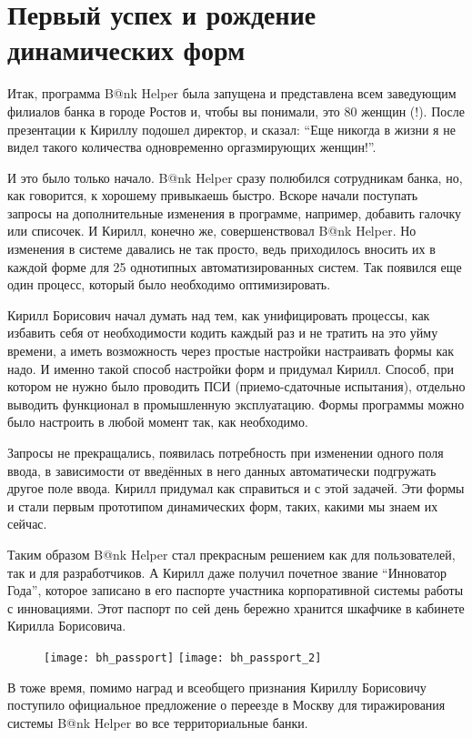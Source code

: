 \documentclass[../index.tex]{subfiles}
\begin{document}
\section{Первый успех и рождение динамических форм}

Итак, программа B@nk Helper была запущена и представлена всем заведующим филиалов банка в городе Ростов и, чтобы вы понимали, это 80 женщин (!). 
После презентации к Кириллу подошел директор, и сказал:
“Еще никогда в жизни я не видел такого количества одновременно оргазмирующих женщин!”.


И это было только начало. B@nk Helper сразу полюбился сотрудникам банка, но, как говорится, к хорошему привыкаешь быстро. Вскоре начали поступать запросы на дополнительные изменения в программе, например, добавить галочку или списочек. И Кирилл, конечно же,  совершенствовал B@nk Helper. Но изменения в системе давались не так просто, ведь приходилось вносить их в каждой форме для 25 однотипных автоматизированных систем. Так появился еще один процесс, который было необходимо оптимизировать. 


Кирилл Борисович начал думать над тем, как унифицировать процессы, как избавить себя от необходимости кодить каждый раз и не тратить на это уйму времени, а иметь возможность через простые настройки настраивать формы как надо. И именно такой способ настройки форм и придумал Кирилл. Способ, при котором не нужно было проводить ПСИ (приемо-сдаточные испытания), отдельно выводить функционал в промышленную эксплуатацию.  Формы программы можно было настроить в любой момент так, как необходимо. 


Запросы не прекращались, появилась потребность при изменении одного поля ввода, в зависимости от введённых в него данных автоматически подгружать другое поле ввода. Кирилл придумал как справиться и с этой задачей. Эти формы и стали первым прототипом динамических форм, таких, какими мы знаем их сейчас. 


Таким образом B@nk Helper стал прекрасным решением как для пользователей, так и для разработчиков. А Кирилл даже получил почетное звание “Инноватор Года”, которое записано в его паспорте участника  корпоративной системы работы с инновациями. Этот паспорт по сей день  бережно хранится шкафчике в кабинете Кирилла Борисовича. 

\begin{figure}[h]
	\texttt{[image: bh\_passport]}
	\texttt{[image: bh\_passport\_2]}
	\centering
\end{figure}

В тоже время, помимо наград и всеобщего признания  Кириллу Борисовичу поступило официальное предложение о переезде в Москву для тиражирования  системы B@nk Helper во все территориальные банки.
\end{document}
